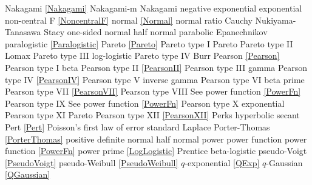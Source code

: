 Nakagami 						\dotfill	\eqref{Nakagami} 					\ncite	%
Nakagami-m 						\dotfill	Nakagami 						\ncite   	%
negative exponential			\dotfill	exponential 						\ncite	%
non-central F					\dotfill	\eqref{NoncentralF}				\ncite	%
normal 							\dotfill	\eqref{Normal}						\ncite	%
normal ratio  					\dotfill	Cauchy 							\ncite	%
Nukiyama-Tanasawa 				\dotfill	Stacy 							   	%
%
one-sided normal  				\dotfill	half normal						\ncite	%
parabolic						\dotfill	Epanechnikov						\ncite
paralogistic					\dotfill	\eqref{Paralogistic} 					\ncite	%
Pareto							\dotfill	\eqref{Pareto}						\ncite	%
Pareto type I					\dotfill	Pareto							\ncite	%
Pareto type II					\dotfill	Lomax 							\ncite	%
Pareto type III					\dotfill	log-logistic						\ncite	%
Pareto type IV					\dotfill	Burr								\ncite	%
Pearson			 				\dotfill	\eqref{Pearson}						\ncite	%
Pearson type I					\dotfill	beta 								\ncite	%
Pearson type II					\dotfill	\eqref{PearsonII}					\ncite	%
Pearson type III   				\dotfill	gamma 								\ncite	%
Pearson type IV   				\dotfill	\eqref{PearsonIV} 					\ncite	%
Pearson type V    				\dotfill	inverse gamma						\ncite	%
Pearson type VI					\dotfill	beta prime 							\ncite	%
Pearson type VII				\dotfill	\eqref{PearsonVII} 					\ncite	%
Pearson type VIII				\dotfill	See power function \eqref{PowerFn}	\ncite	%
Pearson type IX					\dotfill	See power function \eqref{PowerFn}	\ncite	%
Pearson type X    				\dotfill	exponential							\ncite	%
Pearson type XI    				\dotfill	Pareto								
Pearson type XII 				\dotfill	\eqref{PearsonXII}					\ncite	%
Perks							\dotfill	hyperbolic secant 					\ncite	%
Pert							\dotfill	\eqref{Pert} 						\ncite	%
Poisson's first law of error	\dotfill	standard Laplace					\ncite	%
Porter-Thomas					\dotfill	\eqref{PorterThomas}				\ncite
positive definite normal 		\dotfill	half normal 						\ncite 	%
power							\dotfill	power function 						\ncite	%
power function					\dotfill	\eqref{PowerFn}						\ncite	%
power prime						\dotfill	\eqref{LogLogistic}					\mcite{\self}
Prentice 						\dotfill	beta-logistic							
pseudo-Voigt					\dotfill	\eqref{PseudoVoigt}					\ncite
pseudo-Weibull					\dotfill	\eqref{PseudoWeibull}				\ncite	%
%
$q$-exponential					\dotfill	\eqref{QExp}						\ncite	%
$q$-Gaussian					\dotfill	\eqref{QGaussian}					\ncite	%
